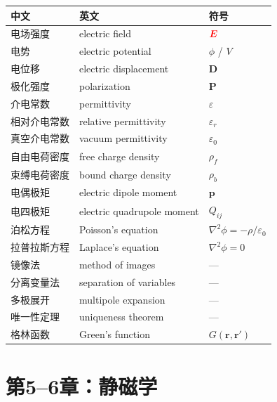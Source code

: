 \documentclass[11pt,a4paper,openany,oneside]{book}
\newcommand{\vecE}{\textcolor{red}{\vect{E}}}
\newcommand{\eps}{\varepsilon}
\newcommand{\vect}[1]{\bm{#1}}
\newcommand{\lap}{\nabla^2}
\begin{document}
\begin{center}
\begin{tabular}{@{}lll@{}}
\toprule
\textbf{中文} & \textbf{英文} & \textbf{符号} \\
\midrule
电场强度 & electric field & $\vecE$ \\
电势 & electric potential & $\phi$ / $V$ \\
电位移 & electric displacement & $\vect{D}$ \\
极化强度 & polarization & $\vect{P}$ \\
介电常数 & permittivity & $\eps$ \\
相对介电常数 & relative permittivity & $\eps_r$ \\
真空介电常数 & vacuum permittivity & $\eps_0$ \\
自由电荷密度 & free charge density & $\rho_f$ \\
束缚电荷密度 & bound charge density & $\rho_b$ \\
电偶极矩 & electric dipole moment & $\vect{p}$ \\
电四极矩 & electric quadrupole moment & $Q_{ij}$ \\
泊松方程 & Poisson's equation & $\lap\phi=-\rho/\eps_0$ \\
拉普拉斯方程 & Laplace's equation & $\lap\phi=0$ \\
镜像法 & method of images & — \\
分离变量法 & separation of variables & — \\
多极展开 & multipole expansion & — \\
唯一性定理 & uniqueness theorem & — \\
格林函数 & Green's function & $G(\vect{r},\vect{r}')$ \\
\bottomrule
\end{tabular}
\end{center}

\section{第5--6章：静磁学}
\end{document}
